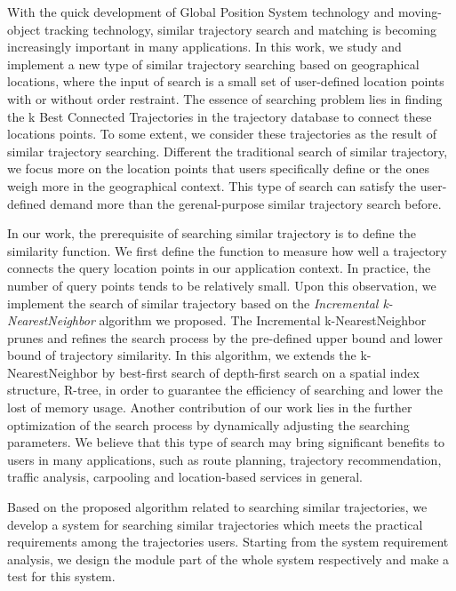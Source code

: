 \begin{englishabstract}
With the quick development of Global Position System technology and moving-object tracking technology, similar trajectory search and matching is becoming increasingly important in many applications. In this work, we study and implement a new type of similar trajectory searching based on geographical locations, where the input of search is a small set of user-defined location points with or without order restraint. The essence of searching problem lies in finding the k Best Connected Trajectories in the trajectory database to connect these locations points. To some extent, we consider these trajectories as the result of similar trajectory searching. Different the traditional search of similar trajectory, we focus more on the location points that users specifically define or the ones weigh more in the geographical context. This type of search can satisfy the user-defined demand more than the gerenal-purpose similar trajectory search before.

In our work, the prerequisite of searching similar trajectory is to define the similarity function. We first define the function to measure how well a trajectory connects the query location points in our application context. In practice, the number of query points tends to be relatively small. Upon this observation, we implement the search of similar trajectory based on the \emph{Incremental k-NearestNeighbor} algorithm we proposed. The Incremental k-NearestNeighbor prunes and refines the search process by the pre-defined upper bound and lower bound of trajectory similarity. In this algorithm, we extends the k-NearestNeighbor by best-first search of depth-first search on a spatial index structure, R-tree, in order to guarantee the efficiency of searching and lower the lost of memory usage. Another contribution of our work lies in the further optimization of the search process by dynamically adjusting the searching parameters. We believe that this type of search may bring significant benefits to users in many applications, such as route planning, trajectory recommendation, traffic analysis, carpooling and location-based services in general.

Based on the proposed algorithm related to searching similar trajectories, we develop a system for searching similar trajectories which meets the practical requirements among the trajectories users. Starting from the system requirement analysis, we design the module part of the whole system respectively and make a test for this system.

\end{englishabstract}

